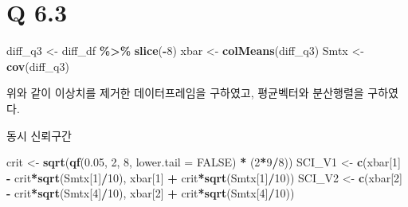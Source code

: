 \documentclass[
]{article}
\newenvironment{Shaded}{\begin{snugshade}}{\end{snugshade}}
\newcommand{\AttributeTok}[1]{\textcolor[rgb]{0.13,0.29,0.53}{#1}}
\newcommand{\ConstantTok}[1]{\textcolor[rgb]{0.56,0.35,0.01}{#1}}
\newcommand{\DecValTok}[1]{\textcolor[rgb]{0.00,0.00,0.81}{#1}}
\newcommand{\FloatTok}[1]{\textcolor[rgb]{0.00,0.00,0.81}{#1}}
\newcommand{\FunctionTok}[1]{\textcolor[rgb]{0.13,0.29,0.53}{\textbf{#1}}}
\newcommand{\NormalTok}[1]{#1}
\newcommand{\OtherTok}[1]{\textcolor[rgb]{0.56,0.35,0.01}{#1}}
\newcommand{\SpecialCharTok}[1]{\textcolor[rgb]{0.81,0.36,0.00}{\textbf{#1}}}
\begin{document}
\section{Q 6.3}\label{q-6.3}

\begin{Shaded}
\begin{Highlighting}[]
\NormalTok{diff\_q3 }\OtherTok{\textless{}{-}}\NormalTok{ diff\_df }\SpecialCharTok{\%\textgreater{}\%} \FunctionTok{slice}\NormalTok{(}\SpecialCharTok{{-}}\DecValTok{8}\NormalTok{)}
\NormalTok{xbar }\OtherTok{\textless{}{-}} \FunctionTok{colMeans}\NormalTok{(diff\_q3)}
\NormalTok{Smtx }\OtherTok{\textless{}{-}} \FunctionTok{cov}\NormalTok{(diff\_q3)}
\end{Highlighting}
\end{Shaded}

위와 같이 이상치를 제거한 데이터프레임을 구하였고, 평균벡터와 분산행렬을
구하였다.

동시 신뢰구간

\begin{Shaded}
\begin{Highlighting}[]
\NormalTok{crit }\OtherTok{\textless{}{-}} \FunctionTok{sqrt}\NormalTok{(}\FunctionTok{qf}\NormalTok{(}\FloatTok{0.05}\NormalTok{, }\DecValTok{2}\NormalTok{, }\DecValTok{8}\NormalTok{, }\AttributeTok{lower.tail =} \ConstantTok{FALSE}\NormalTok{) }\SpecialCharTok{*}\NormalTok{ (}\DecValTok{2}\SpecialCharTok{*}\DecValTok{9}\SpecialCharTok{/}\DecValTok{8}\NormalTok{))}
\NormalTok{SCI\_V1 }\OtherTok{\textless{}{-}} \FunctionTok{c}\NormalTok{(xbar[}\DecValTok{1}\NormalTok{] }\SpecialCharTok{{-}}\NormalTok{ crit}\SpecialCharTok{*}\FunctionTok{sqrt}\NormalTok{(Smtx[}\DecValTok{1}\NormalTok{]}\SpecialCharTok{/}\DecValTok{10}\NormalTok{), xbar[}\DecValTok{1}\NormalTok{] }\SpecialCharTok{+}\NormalTok{ crit}\SpecialCharTok{*}\FunctionTok{sqrt}\NormalTok{(Smtx[}\DecValTok{1}\NormalTok{]}\SpecialCharTok{/}\DecValTok{10}\NormalTok{))}
\NormalTok{SCI\_V2 }\OtherTok{\textless{}{-}} \FunctionTok{c}\NormalTok{(xbar[}\DecValTok{2}\NormalTok{] }\SpecialCharTok{{-}}\NormalTok{ crit}\SpecialCharTok{*}\FunctionTok{sqrt}\NormalTok{(Smtx[}\DecValTok{4}\NormalTok{]}\SpecialCharTok{/}\DecValTok{10}\NormalTok{), xbar[}\DecValTok{2}\NormalTok{] }\SpecialCharTok{+}\NormalTok{ crit}\SpecialCharTok{*}\FunctionTok{sqrt}\NormalTok{(Smtx[}\DecValTok{4}\NormalTok{]}\SpecialCharTok{/}\DecValTok{10}\NormalTok{))}
\end{Highlighting}
\end{Shaded}
\end{document}
